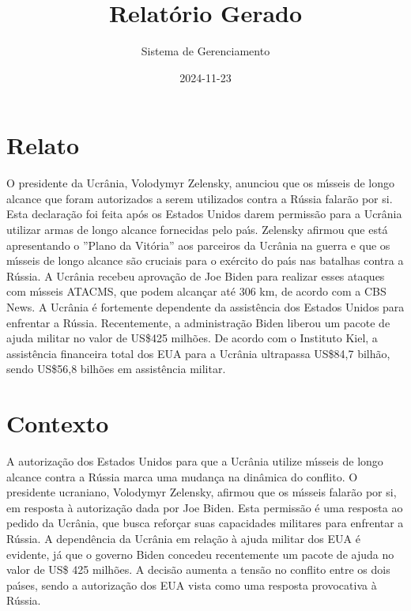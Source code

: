 \documentclass[article,11pt,oneside,a4paper,brazil,sumario=tradicional]{abntex2}%
\title{Relatório Gerado}%
\author{Sistema de Gerenciamento}%
\date{2024{-}11{-}23}%
\begin{document}
%
\normalsize%
\maketitle%
%
\frenchspacing%
\section{Relato}%
\label{sec:Relato}%
O presidente da Ucr\^ania, Volodymyr Zelensky, anunciou que os m{\'\i}sseis de longo alcance que foram autorizados a serem utilizados contra a R\'ussia falar\~ao por si. Esta declara\c{c}\~ao foi feita ap\'os os Estados Unidos darem permiss\~ao para a Ucr\^ania utilizar armas de longo alcance fornecidas pelo pa{\'\i}s. Zelensky afirmou que est\'a apresentando o ''Plano da Vit\'oria'' aos parceiros da Ucr\^ania na guerra e que os m{\'\i}sseis de longo alcance s\~ao cruciais para o ex\'ercito do pa{\'\i}s nas batalhas contra a R\'ussia. A Ucr\^ania recebeu aprova\c{c}\~ao de Joe Biden para realizar esses ataques com m{\'\i}sseis ATACMS, que podem alcan\c{c}ar at\'e 306 km, de acordo com a CBS News. A Ucr\^ania \'e fortemente dependente da assist\^encia dos Estados Unidos para enfrentar a R\'ussia. Recentemente, a administra\c{c}\~ao Biden liberou um pacote de ajuda militar no valor de US\$425 milh\~oes. De acordo com o Instituto Kiel, a assist\^encia financeira total dos EUA para a Ucr\^ania ultrapassa US\$84,7 bilh\~ao, sendo US\$56,8 bilh\~oes em assist\^encia militar.

%
\section{Contexto}%
\label{sec:Contexto}%
A autoriza\c{c}\~ao dos Estados Unidos para que a Ucr\^ania utilize m{\'\i}sseis de longo alcance contra a R\'ussia marca uma mudan\c{c}a na din\^amica do conflito. O presidente ucraniano, Volodymyr Zelensky, afirmou que os m{\'\i}sseis falar\~ao por si, em resposta \`a autoriza\c{c}\~ao dada por Joe Biden. Esta permiss\~ao \'e uma resposta ao pedido da Ucr\^ania, que busca refor\c{c}ar suas capacidades militares para enfrentar a R\'ussia. A depend\^encia da Ucr\^ania em rela\c{c}\~ao \`a ajuda militar dos EUA \'e evidente, j\'a que o governo Biden concedeu recentemente um pacote de ajuda no valor de US\$ 425 milh\~oes. A decis\~ao aumenta a tens\~ao no conflito entre os dois pa{\'\i}ses, sendo a autoriza\c{c}\~ao dos EUA vista como uma resposta provocativa \`a R\'ussia.

%
\end{document}
